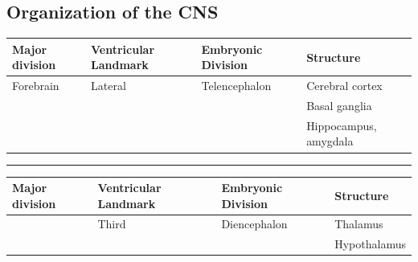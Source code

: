\documentclass[
  letterpaper,
  DIV=11,
  numbers=noendperiod]{scrartcl}
\begin{document}
\subsection{Organization of the CNS}\label{organization-of-the-cns}

\begin{longtable}[]{@{}
  >{\raggedright\arraybackslash}p{}
  >{\raggedright\arraybackslash}p{}
  >{\raggedright\arraybackslash}p{}
  >{\raggedright\arraybackslash}p{}@{}}
\toprule\noalign{}
\begin{minipage}[b]{\linewidth}\raggedright
Major division
\end{minipage} & \begin{minipage}[b]{\linewidth}\raggedright
Ventricular Landmark
\end{minipage} & \begin{minipage}[b]{\linewidth}\raggedright
Embryonic Division
\end{minipage} & \begin{minipage}[b]{\linewidth}\raggedright
Structure
\end{minipage} \\
\midrule\noalign{}
\endhead
\bottomrule\noalign{}
\endlastfoot
Forebrain & Lateral & Telencephalon & Cerebral cortex \\
& & & Basal ganglia \\
& & & Hippocampus, amygdala \\
\end{longtable}

\begin{center}\rule{0.5\linewidth}{0.5pt}\end{center}

\begin{longtable}[]{@{}
  >{\raggedright\arraybackslash}p{}
  >{\raggedright\arraybackslash}p{}
  >{\raggedright\arraybackslash}p{}
  >{\raggedright\arraybackslash}p{}@{}}
\toprule\noalign{}
\begin{minipage}[b]{\linewidth}\raggedright
Major division
\end{minipage} & \begin{minipage}[b]{\linewidth}\raggedright
Ventricular Landmark
\end{minipage} & \begin{minipage}[b]{\linewidth}\raggedright
Embryonic Division
\end{minipage} & \begin{minipage}[b]{\linewidth}\raggedright
Structure
\end{minipage} \\
\midrule\noalign{}
\endhead
\bottomrule\noalign{}
\endlastfoot
& Third & Diencephalon & Thalamus \\
& & & Hypothalamus \\
\end{longtable}
\end{document}
